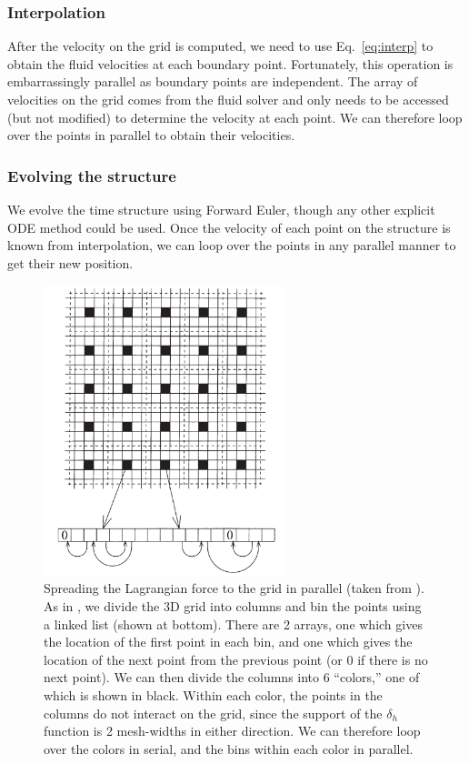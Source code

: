 \documentclass[]{article}
\begin{document}
\subsubsection{Interpolation}
After the velocity on the grid is computed, we need to use Eq.\ \eqref{eq:interp} to obtain the fluid velocities at each boundary point. Fortunately, this operation is embarrassingly parallel as boundary points are independent. The array of velocities on the grid comes from the fluid solver and only needs to be accessed (but not modified) to determine the velocity at each point. We can therefore loop over the points in parallel to obtain their velocities. 

\subsubsection{Evolving the structure}
We evolve the time structure using Forward Euler, though any other explicit ODE method could be used. Once the velocity of each point on the structure is known from interpolation, we can loop over the points in any parallel manner to get their new position. 

\begin{figure}
\centering     
\includegraphics[width=70mm]{PeskinMcQueen.png}
\caption{Spreading the Lagrangian force to the grid in parallel (taken from \cite{mcqueen}). As in \cite{mcqueen}, we divide the 3D grid into columns and bin the points using a linked list (shown at bottom). There are 2 arrays, one which gives the location of the first point in each bin, and one which gives the location of the next point from the previous point (or 0 if there is no next point). We can then divide the columns into 6 ``colors,'' one of which is shown in black. Within each color, the points in the columns do not interact on the grid, since the support of the $\delta_h$ function is 2 mesh-widths in either direction. We can therefore loop over the colors in serial, and the bins within each color in parallel. }
\label{fig:parspread}
\end{figure}
\end{document}
